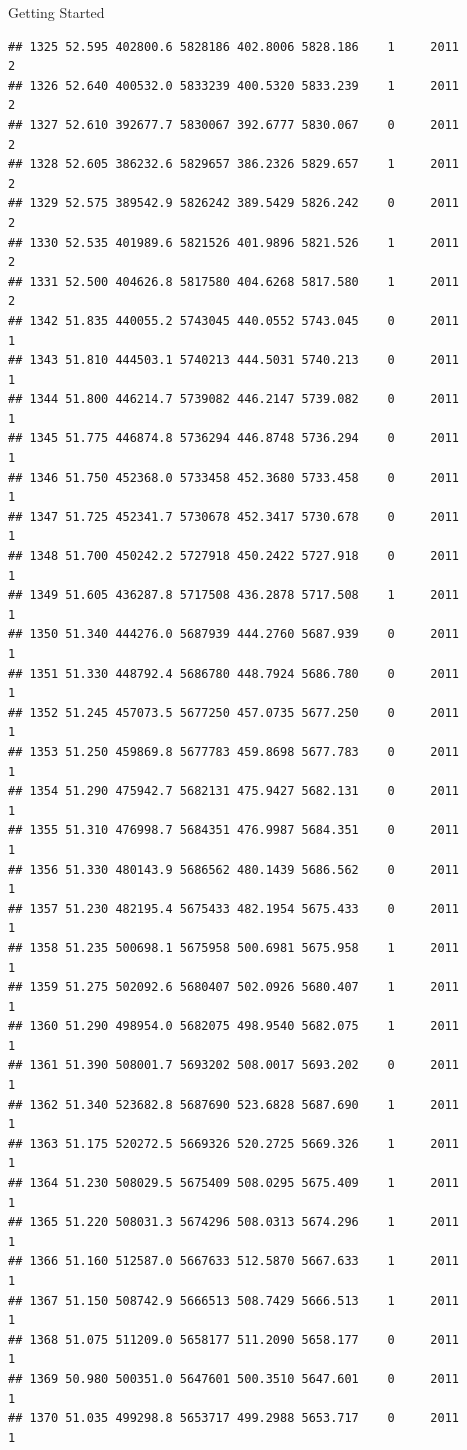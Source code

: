 \documentclass[
  ignorenonframetext,
]{beamer}
\begin{document}
\begin{frame}[fragile]{Getting Started}
\begin{verbatim}
## 1325 52.595 402800.6 5828186 402.8006 5828.186    1     2011        2
## 1326 52.640 400532.0 5833239 400.5320 5833.239    1     2011        2
## 1327 52.610 392677.7 5830067 392.6777 5830.067    0     2011        2
## 1328 52.605 386232.6 5829657 386.2326 5829.657    1     2011        2
## 1329 52.575 389542.9 5826242 389.5429 5826.242    0     2011        2
## 1330 52.535 401989.6 5821526 401.9896 5821.526    1     2011        2
## 1331 52.500 404626.8 5817580 404.6268 5817.580    1     2011        2
## 1342 51.835 440055.2 5743045 440.0552 5743.045    0     2011        1
## 1343 51.810 444503.1 5740213 444.5031 5740.213    0     2011        1
## 1344 51.800 446214.7 5739082 446.2147 5739.082    0     2011        1
## 1345 51.775 446874.8 5736294 446.8748 5736.294    0     2011        1
## 1346 51.750 452368.0 5733458 452.3680 5733.458    0     2011        1
## 1347 51.725 452341.7 5730678 452.3417 5730.678    0     2011        1
## 1348 51.700 450242.2 5727918 450.2422 5727.918    0     2011        1
## 1349 51.605 436287.8 5717508 436.2878 5717.508    1     2011        1
## 1350 51.340 444276.0 5687939 444.2760 5687.939    0     2011        1
## 1351 51.330 448792.4 5686780 448.7924 5686.780    0     2011        1
## 1352 51.245 457073.5 5677250 457.0735 5677.250    0     2011        1
## 1353 51.250 459869.8 5677783 459.8698 5677.783    0     2011        1
## 1354 51.290 475942.7 5682131 475.9427 5682.131    0     2011        1
## 1355 51.310 476998.7 5684351 476.9987 5684.351    0     2011        1
## 1356 51.330 480143.9 5686562 480.1439 5686.562    0     2011        1
## 1357 51.230 482195.4 5675433 482.1954 5675.433    0     2011        1
## 1358 51.235 500698.1 5675958 500.6981 5675.958    1     2011        1
## 1359 51.275 502092.6 5680407 502.0926 5680.407    1     2011        1
## 1360 51.290 498954.0 5682075 498.9540 5682.075    1     2011        1
## 1361 51.390 508001.7 5693202 508.0017 5693.202    0     2011        1
## 1362 51.340 523682.8 5687690 523.6828 5687.690    1     2011        1
## 1363 51.175 520272.5 5669326 520.2725 5669.326    1     2011        1
## 1364 51.230 508029.5 5675409 508.0295 5675.409    1     2011        1
## 1365 51.220 508031.3 5674296 508.0313 5674.296    1     2011        1
## 1366 51.160 512587.0 5667633 512.5870 5667.633    1     2011        1
## 1367 51.150 508742.9 5666513 508.7429 5666.513    1     2011        1
## 1368 51.075 511209.0 5658177 511.2090 5658.177    0     2011        1
## 1369 50.980 500351.0 5647601 500.3510 5647.601    0     2011        1
## 1370 51.035 499298.8 5653717 499.2988 5653.717    0     2011        1

\end{verbatim}
\end{frame}
\end{document}
